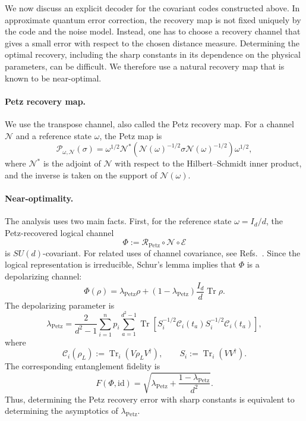 \documentclass[10pt,twocolumn,superscriptaddress,aps,amsmath,amssymb,citeautoscript,floatfix,prx]{revtex4-2}
\theoremstyle{plain}
\theoremstyle{plain}
\theoremstyle{plain}
\theoremstyle{plain}
\theoremstyle{plain}
\theoremstyle{plain}
\begin{document}
We now discuss an explicit decoder for the covariant codes constructed above. In approximate quantum error correction, the recovery map is not fixed uniquely by the code and the noise model. Instead, one has to choose a recovery channel that gives a small error with respect to the chosen distance measure. Determining the optimal recovery, including the sharp constants in its dependence on the physical parameters, can be difficult. We therefore use a natural recovery map that is known to be near-optimal.

\paragraph{Petz recovery map.}

We use the transpose channel, also called the Petz recovery map. For a channel $\mathcal N$ and a reference state $\omega$, the Petz map is
$$
\mathcal P_{\omega,\mathcal N}(\sigma)
=
\omega^{1/2}
\mathcal N^*
\left(
\mathcal N(\omega)^{-1/2}
\sigma
\mathcal N(\omega)^{-1/2}
\right)
\omega^{1/2},
$$
where $\mathcal N^*$ is the adjoint of $\mathcal N$ with respect to the Hilbert--Schmidt inner product, and the inverse is taken on the support of $\mathcal N(\omega)$.

\paragraph{Near-optimality.}

The analysis uses two main facts. First, for the reference state $\omega=I_d/d$, the Petz-recovered logical channel
$$
\Phi
:=
\mathcal R_{\mathrm{Petz}}
\circ
\mathcal N
\circ
\mathcal E
$$
is $SU(d)$-covariant. For related uses of channel covariance, see Refs.~\cite{Zhou2021, Alexander2025}. Since the logical representation is irreducible, Schur's lemma implies that $\Phi$ is a depolarizing channel:
$$
\Phi(\rho)
=
\lambda_{\mathrm{Petz}}\rho
+
\left(1-\lambda_{\mathrm{Petz}}\right)
\frac{I_d}{d}\operatorname{Tr}\rho .
$$
The depolarizing parameter is
\begin{equation}\label{eq:lambda_P}
\lambda_{\mathrm{Petz}}
=
\frac{2}{d^2-1}
\sum_{i=1}^n p_i
\sum_{a=1}^{d^2-1}
\operatorname{Tr}
\left[
S_i^{-1/2}
\mathcal C_i(t_a)
S_i^{-1/2}
\mathcal C_i(t_a)
\right],
\end{equation}
where
$$
\mathcal C_i(\rho_L)
:=
\operatorname{Tr}_i\left(V\rho_LV^\dagger\right),
\qquad
S_i
:=
\operatorname{Tr}_i\left(VV^\dagger\right).
$$
The corresponding entanglement fidelity is
$$
F(\Phi,\mathrm{id})
=
\sqrt{
\lambda_{\mathrm{Petz}}
+
\frac{1-\lambda_{\mathrm{Petz}}}{d^2}
} .
$$
Thus, determining the Petz recovery error with sharp constants is equivalent to determining the asymptotics of $\lambda_{\mathrm{Petz}}$.
\end{document}
